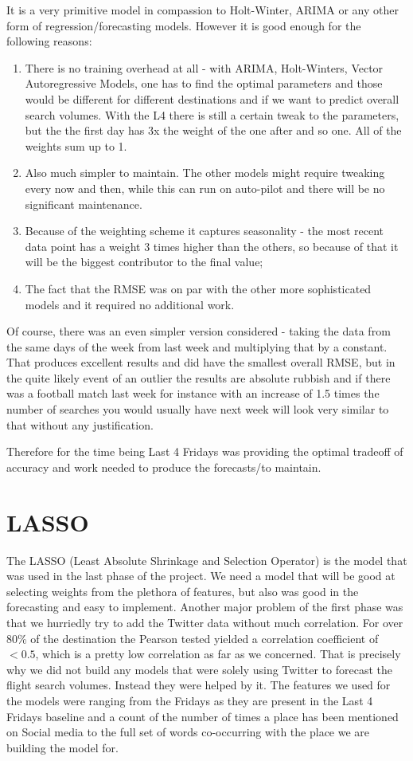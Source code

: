 \documentclass[minf,twoside,singlespacing,parskip,frontabs,notimes,12pt]{infthesis} %
\begin{document}
It is a very primitive model in compassion to Holt-Winter, ARIMA or any other form of regression/forecasting models. However it is good enough for the following reasons:
\begin{enumerate}
\item There is no training overhead at all  - with ARIMA, Holt-Winters, Vector Autoregressive Models, one has to find the optimal parameters and those would be different for different destinations and if we want to predict overall search volumes. With the L4 there is still a certain tweak to the parameters, but the the first day has 3x the weight of the one after and so one. All of the weights sum up to 1.
\item Also much simpler to maintain. The other models might require tweaking every now and then, while this can run on auto-pilot and there will be no significant maintenance.
\item Because of the weighting scheme it captures seasonality - the most recent data point has a weight 3 times higher than the others, so  because of that it will be the biggest contributor to the final value; 
\item The fact that the RMSE was on par with the other more sophisticated models and it required no additional work. 
\end{enumerate}

Of course, there was an even simpler version considered - taking the data from the same days of the week from last week and multiplying that by a constant. That produces excellent results and did have the smallest overall RMSE, but in the quite likely event of an outlier the results are absolute rubbish and if there was a football match last week for instance with an increase of 1.5 times the number of searches you would usually have next week will look very similar to that without any justification. 

Therefore for the time being Last 4 Fridays was providing the optimal tradeoff of accuracy and work needed to produce the forecasts/to maintain. 

\section{LASSO}

The LASSO (Least Absolute Shrinkage and Selection Operator) is the model that was used in the last phase of the project. We need a model that will be good at selecting weights from the plethora of features, but also was good in the forecasting and easy to implement.  Another major problem of the first phase was that we hurriedly try to add the Twitter data without much correlation. For over 80\% of the destination the Pearson tested yielded a correlation coefficient of $<0.5$, which is a pretty low correlation as far as we concerned. That is precisely why we did not build any models that were solely using Twitter to forecast the flight search volumes. Instead they were helped  by it. The features we used for the models were ranging from the Fridays as they are present in the Last 4 Fridays baseline and a count of the number of times a place has been mentioned on Social media to the full set of words co-occurring with the place we are building the model for. 
\end{document}
